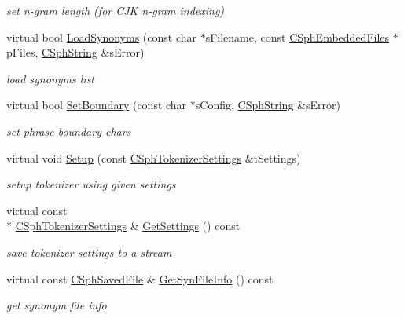 \begin{DoxyCompactItemize}
\begin{DoxyCompactList}\small\item\em set n-\/gram length (for C\-J\-K n-\/gram indexing) \end{DoxyCompactList}\item 
virtual bool \hyperlink{classCSphMultiformTokenizer_ae938689d752a977e81782500b26e8859}{Load\-Synonyms} (const char $\ast$s\-Filename, const \hyperlink{structCSphEmbeddedFiles}{C\-Sph\-Embedded\-Files} $\ast$p\-Files, \hyperlink{structCSphString}{C\-Sph\-String} \&s\-Error)
\begin{DoxyCompactList}\small\item\em load synonyms list \end{DoxyCompactList}\item 
virtual bool \hyperlink{classCSphMultiformTokenizer_a95b5707fd7ef4bd4d2b7768c3370ebf6}{Set\-Boundary} (const char $\ast$s\-Config, \hyperlink{structCSphString}{C\-Sph\-String} \&s\-Error)
\begin{DoxyCompactList}\small\item\em set phrase boundary chars \end{DoxyCompactList}\item 
virtual void \hyperlink{classCSphMultiformTokenizer_a8c9072d5aa92ef118b6ef740692f0d50}{Setup} (const \hyperlink{structCSphTokenizerSettings}{C\-Sph\-Tokenizer\-Settings} \&t\-Settings)
\begin{DoxyCompactList}\small\item\em setup tokenizer using given settings \end{DoxyCompactList}\item 
virtual const \\*
\hyperlink{structCSphTokenizerSettings}{C\-Sph\-Tokenizer\-Settings} \& \hyperlink{classCSphMultiformTokenizer_a7ef3fa07328ce8dffff873e68657983d}{Get\-Settings} () const 
\begin{DoxyCompactList}\small\item\em save tokenizer settings to a stream \end{DoxyCompactList}\item 
virtual const \hyperlink{structCSphSavedFile}{C\-Sph\-Saved\-File} \& \hyperlink{classCSphMultiformTokenizer_ac730b11ea3ae60f51dd95b06d60575f6}{Get\-Syn\-File\-Info} () const 
\begin{DoxyCompactList}\small\item\em get synonym file info \end{DoxyCompactList}\item 

\end{DoxyCompactItemize}
